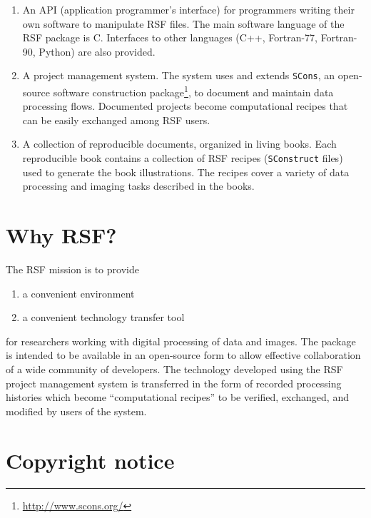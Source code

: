 \begin{enumerate}
\item An API (application programmer's interface) for programmers writing
  their own software to manipulate RSF files. The main software language of
  the RSF package is C. Interfaces to other languages (C++, Fortran-77,
  Fortran-90, Python) are also provided.
  
\item A project management system. The system uses and extends \texttt{SCons},
  an open-source software construction
  package\footnote{\url{http://www.scons.org/}}, to document and maintain data
  processing flows. Documented projects become computational recipes that can
  be easily exchanged among RSF users.
\item A collection of reproducible documents, organized in living books. Each
  reproducible book contains a collection of RSF recipes (\texttt{SConstruct}
  files) used to generate the book illustrations. The recipes cover a variety
  of data processing and imaging tasks described in the books.
\end{enumerate}


\section{Why RSF?}

The RSF mission is to provide
\begin{enumerate}
\item a convenient environment
\item a convenient technology transfer tool
\end{enumerate}
for researchers working with digital processing of data and images. The
package is intended to be available in an open-source form to allow effective
collaboration of a wide community of developers. The technology developed
using the RSF project management system is transferred in the form of recorded
processing histories which become ``computational recipes'' to be verified,
exchanged, and modified by users of the system.

\section{Copyright notice}

